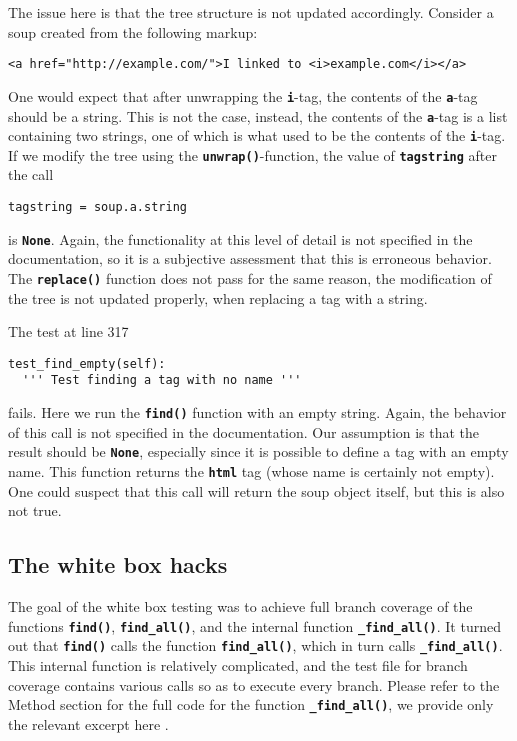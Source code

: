 \documentclass[10pt]{article}
\newcommand{\tbt}[1]{\texttt{\textbf{#1}}}
\begin{document}
The issue here is that the tree structure is not updated accordingly. Consider a soup created from the following markup:
\begin{lstlisting}[style = htmlstyle]
  <a href="http://example.com/">I linked to <i>example.com</i></a>
\end{lstlisting}
One would expect that after unwrapping the \tbt{i}-tag, the contents of the \tbt{a}-tag should be a string. This is not the case, instead, the contents of the \tbt{a}-tag is a list containing two strings, one of which is what used to be the contents of the \tbt{i}-tag. If we modify the tree using the \tbt{unwrap()}-function, the value of \tbt{tagstring} after the call
\begin{lstlisting}[style = pythonstyle]
  tagstring = soup.a.string
\end{lstlisting}
is \tbt{None}. 
Again, the functionality at this level of detail is not specified in the documentation, so it is a subjective assessment that this is erroneous behavior. \\

The \tbt{replace()} function does not pass for the same reason, the modification of the tree is not updated properly, when replacing a tag with a string. \\

\noindent\begin{minipage}{\textwidth}
\indent{\hspace{12pt}} The test at line 317
\begin{lstlisting}[style = pythonstyle]
test_find_empty(self):
  ''' Test finding a tag with no name '''
\end{lstlisting}
\end{minipage}
fails. Here we run the \tbt{find()} function with an empty string. Again, the behavior of this call is not specified in the documentation. Our assumption is that the result should be \tbt{None}, especially since it is possible to define a tag with an empty name. This function returns the \tbt{html} tag (whose name is certainly not empty). One could suspect that this call will return the soup object itself, but this is also not true. 


\subsection{The white box hacks}

The goal of the white box testing was to achieve full branch coverage of the functions \tbt{find()}, \tbt{find\_all()}, and the internal function \tbt{\_find\_all()}. It turned out that \tbt{find()} calls the function \tbt{find\_all()}, which in turn calls \tbt{\_find\_all()}. This internal function is relatively complicated, and the test file for branch coverage contains various calls so as to execute every branch. Please refer to the Method section for the full code for the function \tbt{\_find\_all()}, we provide only the relevant excerpt here . \\
\end{document}
